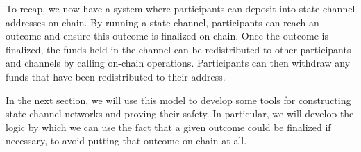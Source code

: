 To recap, we now have a system where participants can deposit into state channel addresses on-chain.
By running a state channel, participants can reach an outcome and ensure this outcome is finalized on-chain.
Once the outcome is finalized, the funds held in the channel can be redistributed to other participants and channels by calling on-chain operations.
Participants can then withdraw any funds that have been redistributed to their address.

In the next section, we will use this model to develop some tools for constructing state channel networks and proving their safety.
In particular, we will develop the logic by which we can use the fact that a given outcome could be finalized if necessary, to avoid putting that outcome on-chain at all.

